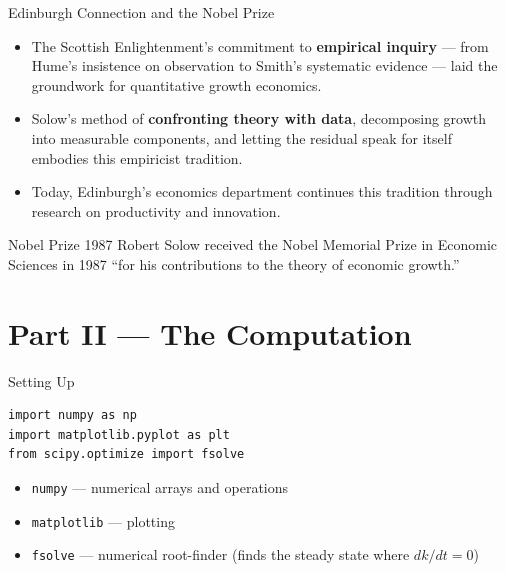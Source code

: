 \documentclass[aspectratio=169, 10pt]{beamer}
\begin{document}
\begin{frame}{Edinburgh Connection and the Nobel Prize}
\begin{itemize}
  \item The Scottish Enlightenment's commitment to \textbf{empirical inquiry}
        --- from Hume's insistence on observation to Smith's systematic
        evidence --- laid the groundwork for quantitative growth economics.
  \item Solow's method of \textbf{confronting theory with data},
        decomposing growth into measurable components, and letting
        the residual speak for itself embodies this empiricist tradition.
  \item Today, Edinburgh's economics department continues this tradition
        through research on productivity and innovation.
\end{itemize}
\vspace{0.5em}
\begin{alertblock}{Nobel Prize 1987}
Robert Solow received the Nobel Memorial Prize in Economic Sciences
in 1987 ``for his contributions to the theory of economic growth.''
\end{alertblock}
\end{frame}

\section{Part II --- The Computation}

\begin{frame}[fragile]{Setting Up}
\begin{lstlisting}
import numpy as np
import matplotlib.pyplot as plt
from scipy.optimize import fsolve
\end{lstlisting}
\vspace{0.5em}
\begin{itemize}
  \item \texttt{numpy} --- numerical arrays and operations
  \item \texttt{matplotlib} --- plotting
  \item \texttt{fsolve} --- numerical root-finder
        (finds the steady state where $dk/dt = 0$)
\end{itemize}
\end{frame}
\end{document}
